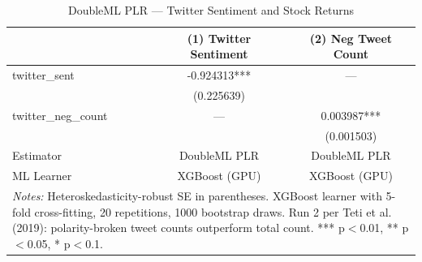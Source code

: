 \begin{table}[htbp]
\centering
\caption{DoubleML PLR --- Twitter Sentiment and Stock Returns}
\begin{tabular}{lcc}
\hline\hline
 & (1) Twitter Sentiment & (2) Neg Tweet Count \\
\hline
twitter\_sent & -0.924313*** & --- \\
& (0.225639) &  \\
twitter\_neg\_count & --- & 0.003987*** \\
&  & (0.001503) \\
\hline
Estimator & DoubleML PLR & DoubleML PLR \\
ML Learner & XGBoost (GPU) & XGBoost (GPU) \\
\hline\hline
\multicolumn{3}{l}{\footnotesize \textit{Notes:} Heteroskedasticity-robust SE in parentheses. XGBoost learner with 5-fold cross-fitting, 20 repetitions, 1000 bootstrap draws. Run 2 per Teti et al. (2019): polarity-broken tweet counts outperform total count. *** p$<$0.01, ** p$<$0.05, * p$<$0.1.} \\
\end{tabular}
\end{table}